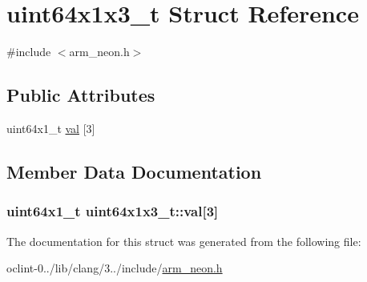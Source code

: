\hypertarget{structuint64x1x3__t}{\section{uint64x1x3\-\_\-t Struct Reference}
\label{structuint64x1x3__t}
}


{\ttfamily \#include $<$arm\-\_\-neon.\-h$>$}

\subsection*{Public Attributes}
\begin{DoxyCompactItemize}
\item 
uint64x1\-\_\-t \hyperlink{structuint64x1x3__t_a6146ce8fbfccdf8f0f93233c83cb7959}{val} \mbox{[}3\mbox{]}
\end{DoxyCompactItemize}


\subsection{Member Data Documentation}
\hypertarget{structuint64x1x3__t_a6146ce8fbfccdf8f0f93233c83cb7959}{
\subsubsection[{val}]{\setlength{\rightskip}{0pt plus 5cm}uint64x1\-\_\-t uint64x1x3\-\_\-t\-::val\mbox{[}3\mbox{]}}}\label{structuint64x1x3__t_a6146ce8fbfccdf8f0f93233c83cb7959}


The documentation for this struct was generated from the following file\-:\begin{DoxyCompactItemize}
\item 
oclint-\/0../lib/clang/3../include/\hyperlink{arm__neon_8h}{arm\-\_\-neon.\-h}\end{DoxyCompactItemize}
